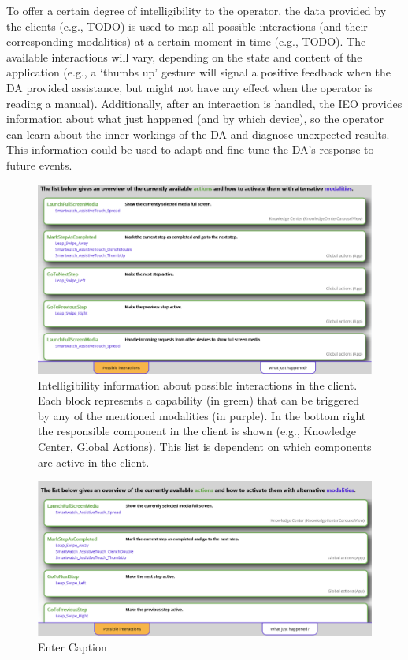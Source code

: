 To offer a certain degree of intelligibility to the operator, the data provided by the clients (e.g., TODO) is used to map all possible interactions (and their corresponding modalities) at a certain moment in time (e.g., TODO). The available interactions will vary, depending on the state and content of the application (e.g., a `thumbs up' gesture will signal a positive feedback when the DA provided assistance, but might not have any effect when the operator is reading a manual). Additionally, after an interaction is handled, the IEO provides information about what just happened (and by which device), so the operator can learn about the inner workings of the DA and diagnose unexpected results. This information could be used to adapt and fine-tune the DA's response to future events.

\begin{figure}
    \centering
    \includegraphics[width=1\linewidth]{ui-possible-interactions.png}
    \caption{Intelligibility information about possible interactions in the client. Each block represents a capability (in green) that can be triggered by any of the mentioned modalities (in purple). In the bottom right the responsible component in the client is shown (e.g., Knowledge Center, Global Actions). This list is dependent on which components are active in the client.}
    \label{fig:enter-label}
\end{figure}

\begin{figure}
    \centering
    \includegraphics[width=0.5\linewidth]{ui-222.png}
    \caption{Enter Caption}
    \label{fig:enter-label}
\end{figure}

